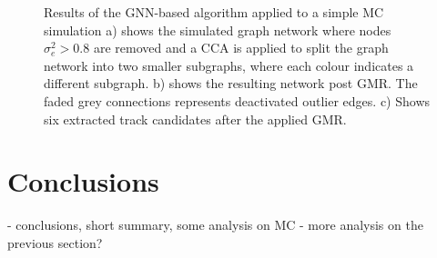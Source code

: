 \begin{center}
\begin{figure}[!htbp]
    \caption{Results of the GNN-based algorithm applied to a simple MC simulation a) shows the simulated graph network where nodes $\sigma_e^2 > 0.8$ are removed and a CCA is applied to split the graph network into two smaller subgraphs, where each colour indicates a different subgraph. b) shows the resulting network post GMR. The faded grey connections represents deactivated outlier edges. c) Shows six extracted track candidates after the applied GMR.}%
    \label{fig:example-application-2}%
\end{figure}
\end{center}



\section{Conclusions}
- conclusions, short summary, some analysis on MC
- more analysis on the previous section?
